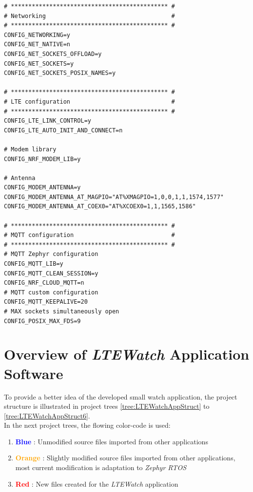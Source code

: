 \documentclass[report.tex]{subfiles}
\begin{document}
\begin{lstlisting}[style=console,label={lst:mqtt_def},caption={Application \textit{LTE/MQTT} Configuration}]
# ********************************************* #
# Networking                                    #
# ********************************************* #
CONFIG_NETWORKING=y
CONFIG_NET_NATIVE=n
CONFIG_NET_SOCKETS_OFFLOAD=y
CONFIG_NET_SOCKETS=y
CONFIG_NET_SOCKETS_POSIX_NAMES=y

# ********************************************* #
# LTE configuration                             #
# ********************************************* #
CONFIG_LTE_LINK_CONTROL=y
CONFIG_LTE_AUTO_INIT_AND_CONNECT=n

# Modem library
CONFIG_NRF_MODEM_LIB=y

# Antenna
CONFIG_MODEM_ANTENNA=y
CONFIG_MODEM_ANTENNA_AT_MAGPIO="AT%XMAGPIO=1,0,0,1,1,1574,1577"
CONFIG_MODEM_ANTENNA_AT_COEX0="AT%XCOEX0=1,1,1565,1586"

# ********************************************* #
# MQTT configuration                            #
# ********************************************* #
# MQTT Zephyr configuration
CONFIG_MQTT_LIB=y
CONFIG_MQTT_CLEAN_SESSION=y
CONFIG_NRF_CLOUD_MQTT=n
# MQTT custom configuration
CONFIG_MQTT_KEEPALIVE=20
# MAX sockets simultaneously open
CONFIG_POSIX_MAX_FDS=9
\end{lstlisting}

\section{Overview of \textit{LTEWatch} Application Software}

To provide a better idea of the developed small watch application, the project structure is illustrated in project trees \ref{tree:LTEWatchAppStruct} to \ref{tree:LTEWatchAppStruct6}.\\

In the next project trees, the flowing color-code is used:
\begin{enumerate}
\item \textbf{\textcolor{blue}{Blue}} : Unmodified source files imported from other applications
\item \textbf{\textcolor{orange}{Orange}} : Slightly modified source files imported from other applications, most current modification is adaptation to \textit{Zephyr RTOS}
\item \textbf{\textcolor{red}{Red}} :  New files created for the \textit{LTEWatch} application
\end{enumerate}
\end{document}
